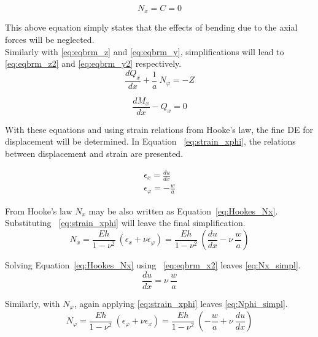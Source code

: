 \begin{equation}
	\label{eq:eqbrm_x2}
	N_x = C = 0 
\end{equation}

This above equation simply states that the effects of bending due to the axial forces will be neglected.\\

Similarly with \ref{eq:eqbrm_z} and \ref{eq:eqbrm_y}, simplifications will lead to \ref{eq:eqbrm_z2} and \ref{eq:eqbrm_y2} respectively.
\begin{equation}
	\label{eq:eqbrm_z2}
	\frac{dQ_x}{dx}+\frac{1}{a}\ N_\varphi = -Z
\end{equation}

\begin{equation}
	\label{eq:eqbrm_y2}
	\frac{dM_x}{dx}- Q_x= 0
\end{equation} 

With these equations and using strain relations from Hooke's law, the fine DE for displacement will be determined. In Equation ~\ref{eq:strain_xphi}, the relations between displacement and strain are presented.

\begin{equation}
	\label{eq:strain_xphi}
	\begin{aligned}
		\epsilon_x = \frac{du}{dx}      \\
		\epsilon_\varphi = -\frac{w}{a} 
	\end{aligned}
\end{equation}

From Hooke's law $N_x$ may be also written as Equation~\ref{eq:Hookes_Nx}. Substituting ~\ref{eq:strain_xphi} will leave the final simplification.
\begin{equation}
	\label{eq:Hookes_Nx}
	N_x = \frac{Eh}{1-\nu^2}\ \left( \epsilon_x + \nu \epsilon_\varphi \right) =  \frac{Eh}{1-\nu^2}\ \left( \frac{du}{dx} -\nu \ \frac{w}{a} \right)
\end{equation} 

Solving Equation~\ref{eq:Hookes_Nx} using ~\ref{eq:eqbrm_x2} leaves \ref{eq:Nx_simpl}.
\begin{equation}
	\label{eq:Nx_simpl}
	\frac{du}{dx} =  \nu \ \frac{w}{a}
\end{equation} 

Similarly, with $N_\varphi$, again applying \ref{eq:strain_xphi} leaves \ref{eq:Nphi_simpl}.
\begin{equation}
	\label{eq:Hookes_Nphi}
	N_\varphi = \frac{Eh}{1-\nu^2}\ \left( \epsilon_\varphi + \nu \epsilon_x \right) = \frac{Eh}{1-\nu^2}\  \left( -\frac{w}{a}+\nu \ \frac{du}{dx} \right)
\end{equation} 

